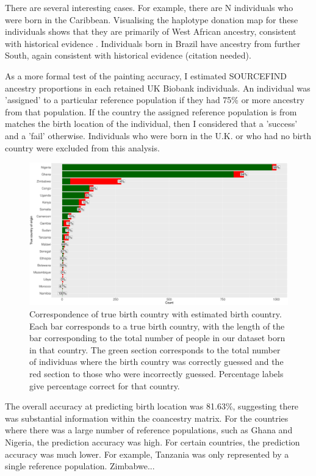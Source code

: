 There are several interesting cases. For example, there are N individuals who were born in the Caribbean. Visualising the haplotype donation map for these individuals shows that they are primarily of West African ancestry, consistent with historical evidence \cite{micheletti2020genetic}. Individuals born in Brazil have ancestry from further South, again consistent with historical evidence (citation needed).

As a more formal test of the painting accuracy, I estimated SOURCEFIND ancestry proportions in each retained UK Biobank individuals. An individual was 'assigned' to a particular reference population if they had 75\% or more ancestry from that population. If the country the assigned reference population is from matches the birth location of the individual, then I considered that a 'success' and a 'fail' otherwise. Individuals who were born in the U.K. or who had no birth country were excluded from this analysis. 

\begin{figure}[htp]
    \centering
    \includegraphics[width=1.0\textwidth]{../images/chapter3/country_of_origin_allInds.png}
    \caption{Correspondence of true birth country with estimated birth country. Each bar corresponds to a true birth country, with the length of the bar corresponding to the total number of people in our dataset born in that country. The green section corresponds to the total number of individuas where the birth country was correctly guessed and the red section to those who were incorrectly guessed. Percentage labels give percentage correct for that country.}
    \label{fig:country_of_origin_allInds}
\end{figure}

The overall accuracy at predicting birth location was 81.63\%, suggesting there was substantial information within the coancestry matrix. For the countries where there was a large number of reference populations, such as Ghana and Nigeria, the prediction accuracy was high. For certain countries, the prediction accuracy was much lower. For example, Tanzania was only represented by a single reference population. Zimbabwe...


